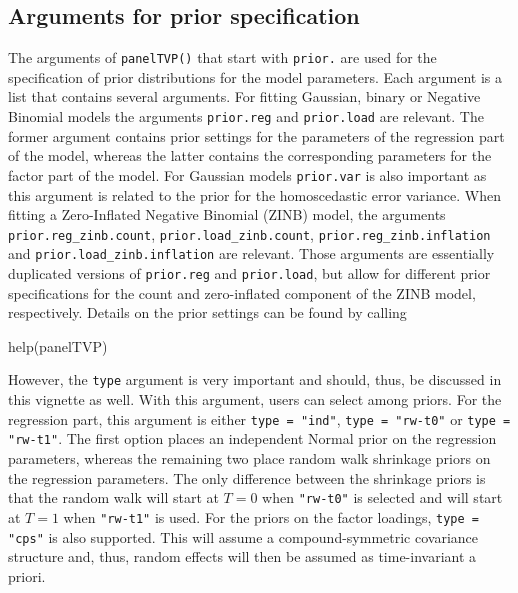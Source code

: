 \documentclass[a4paper, preprint, 3p,
authoryear]{elsarticle} %
\newenvironment{Shaded}{\begin{snugshade}}{\end{snugshade}}
\newcommand{\NormalTok}[1]{#1}
\begin{document}
\subsection{Arguments for prior
specification}\label{arguments-for-prior-specification}

The arguments of \texttt{panelTVP()} that start with \texttt{prior.} are
used for the specification of prior distributions for the model
parameters. Each argument is a list that contains several arguments. For
fitting Gaussian, binary or Negative Binomial models the arguments
\texttt{prior.reg} and \texttt{prior.load} are relevant. The former
argument contains prior settings for the parameters of the regression
part of the model, whereas the latter contains the corresponding
parameters for the factor part of the model. For Gaussian models
\texttt{prior.var} is also important as this argument is related to the
prior for the homoscedastic error variance. When fitting a Zero-Inflated
Negative Binomial (ZINB) model, the arguments
\texttt{prior.reg\_zinb.count}, \texttt{prior.load\_zinb.count},
\texttt{prior.reg\_zinb.inflation} and
\texttt{prior.load\_zinb.inflation} are relevant. Those arguments are
essentially duplicated versions of \texttt{prior.reg} and
\texttt{prior.load}, but allow for different prior specifications for
the count and zero-inflated component of the ZINB model, respectively.
Details on the prior settings can be found by calling

\begin{Shaded}
\begin{Highlighting}[]
\NormalTok{help(panelTVP)}
\end{Highlighting}
\end{Shaded}

However, the \texttt{type} argument is very important and should, thus,
be discussed in this vignette as well. With this argument, users can
select among priors. For the regression part, this argument is either
\texttt{type = "ind"}, \texttt{type = "rw-t0"} or
\texttt{type = "rw-t1"}. The first option places an independent Normal
prior on the regression parameters, whereas the remaining two place
random walk shrinkage priors on the regression parameters. The only
difference between the shrinkage priors is that the random walk will
start at \(T=0\) when \texttt{"rw-t0"} is selected and will start at
\(T=1\) when \texttt{"rw-t1"} is used. For the priors on the factor
loadings, \texttt{type = "cps"} is also supported. This will assume a
compound-symmetric covariance structure and, thus, random effects will
then be assumed as time-invariant a priori.
\end{document}

